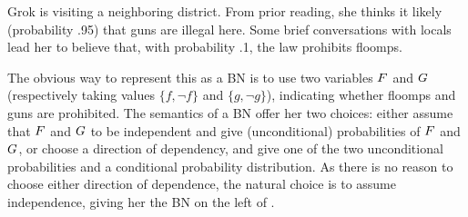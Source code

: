 \begin{example} \label{ex:guns-and-floomps}
Grok is visiting a neighboring district. From prior reading, she thinks it
likely (probability .95) that guns are illegal here. Some brief conversations
with locals lead her to believe that, with probability .1, the law
prohibits floomps.

The obvious way to represent this as a BN is to use two variables
${F}$ and ${G}$ (respectively taking values $\{f, \lnot f\}$ and
$\{ g, \lnot g\}$),
indicating whether  floomps and guns are prohibited.
The semantics of a BN offer her two choices: either assume that ${F}$ and ${G}$
to be independent and give (unconditional) probabilities of ${F}$ and ${G}$, or
choose a direction of dependency, and give one of the two unconditional
probabilities and a conditional probability distribution. 
As there is no reason to choose either direction of dependence, the
natural choice is to 
assume independence, giving her the 
BN on the left of .

\begin{figure}[htb]
  \centering
\ifprecompiledfigs
~\vrule~
\else
\end{figure}
\end{example}
